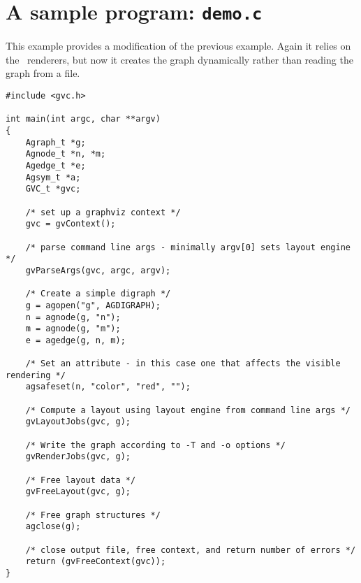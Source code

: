 \section{A sample program: {\tt demo.c}}
\label{sec:demo}
This example provides a modification of the previous example. Again it
relies on the \gviz\ renderers, but now it creates the graph dynamically
rather than reading the graph from a file.   
\begin{verbatim}
#include <gvc.h>

int main(int argc, char **argv)
{
    Agraph_t *g;
    Agnode_t *n, *m;
    Agedge_t *e;
    Agsym_t *a;
    GVC_t *gvc;

    /* set up a graphviz context */
    gvc = gvContext();

    /* parse command line args - minimally argv[0] sets layout engine */
    gvParseArgs(gvc, argc, argv);

    /* Create a simple digraph */
    g = agopen("g", AGDIGRAPH);
    n = agnode(g, "n");
    m = agnode(g, "m");
    e = agedge(g, n, m);

    /* Set an attribute - in this case one that affects the visible rendering */
    agsafeset(n, "color", "red", "");

    /* Compute a layout using layout engine from command line args */
    gvLayoutJobs(gvc, g);

    /* Write the graph according to -T and -o options */
    gvRenderJobs(gvc, g);

    /* Free layout data */
    gvFreeLayout(gvc, g);

    /* Free graph structures */
    agclose(g);

    /* close output file, free context, and return number of errors */
    return (gvFreeContext(gvc));
}
\end{verbatim}
